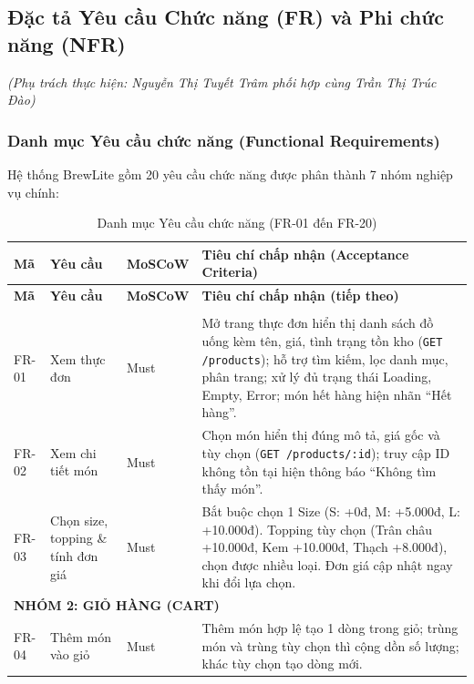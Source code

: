 \subsection{Đặc tả Yêu cầu Chức năng (FR) và Phi chức năng (NFR)}
\textit{(Phụ trách thực hiện: Nguyễn Thị Tuyết Trâm phối hợp cùng Trần Thị Trúc Đào)}

\subsubsection{Danh mục Yêu cầu chức năng (Functional Requirements)}
Hệ thống BrewLite gồm 20 yêu cầu chức năng được phân thành 7 nhóm nghiệp vụ chính:

\small
\renewcommand{\arraystretch}{1.22}
\begin{longtable}{|p{}|p{}|p{}|p{}|}
\caption{Danh mục Yêu cầu chức năng (FR-01 đến FR-20)} \\
\hline
\textbf{Mã} & \textbf{Yêu cầu} & \textbf{MoSCoW} & \textbf{Tiêu chí chấp nhận (Acceptance Criteria)} \\
\hline
\endfirsthead
\hline
\textbf{Mã} & \textbf{Yêu cầu} & \textbf{MoSCoW} & \textbf{Tiêu chí chấp nhận (tiếp theo)} \\
\hline
\endhead
\hline
\endfoot
\multicolumn{4}{|l|}{\textbf{NHÓM 1: THỰC ĐƠN (MENU)}} \\
\hline
FR-01 & Xem thực đơn & Must & Mở trang thực đơn hiển thị danh sách đồ uống kèm tên, giá, tình trạng tồn kho (\texttt{GET /products}); hỗ trợ tìm kiếm, lọc danh mục, phân trang; xử lý đủ trạng thái Loading, Empty, Error; món hết hàng hiện nhãn ``Hết hàng''. \\
\hline
FR-02 & Xem chi tiết món & Must & Chọn món hiển thị đúng mô tả, giá gốc và tùy chọn (\texttt{GET /products/:id}); truy cập ID không tồn tại hiện thông báo ``Không tìm thấy món''. \\
\hline
FR-03 & Chọn size, topping \& tính đơn giá & Must & Bắt buộc chọn 1 Size (S: +0đ, M: +5.000đ, L: +10.000đ). Topping tùy chọn (Trân châu +10.000đ, Kem +10.000đ, Thạch +8.000đ), chọn được nhiều loại. Đơn giá cập nhật ngay khi đổi lựa chọn. \\
\hline
\multicolumn{4}{|l|}{\textbf{NHÓM 2: GIỎ HÀNG (CART)}} \\
\hline
FR-04 & Thêm món vào giỏ & Must & Thêm món hợp lệ tạo 1 dòng trong giỏ; trùng món và trùng tùy chọn thì cộng dồn số lượng; khác tùy chọn tạo dòng mới. \\

\end{longtable}
